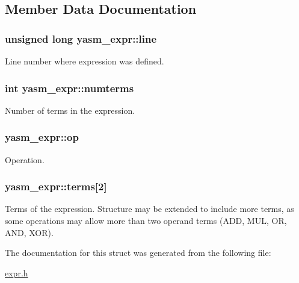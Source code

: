 \subsection{Member Data Documentation}
\hypertarget{structyasm__expr_a6eb7b868214984a4eb2c1fd4e86bf63b}{
\subsubsection[{line}]{\setlength{\rightskip}{0pt plus 5cm}unsigned long yasm\-\_\-expr\-::line}}\label{structyasm__expr_a6eb7b868214984a4eb2c1fd4e86bf63b}
Line number where expression was defined. \hypertarget{structyasm__expr_ac21ba309d6e842be19ce00c513645d93}{
\subsubsection[{numterms}]{\setlength{\rightskip}{0pt plus 5cm}int yasm\-\_\-expr\-::numterms}}\label{structyasm__expr_ac21ba309d6e842be19ce00c513645d93}
Number of terms in the expression. \hypertarget{structyasm__expr_a4a552c2cc6aedeab0811401e00de6536}{
\subsubsection[{op}]{ yasm\-\_\-expr\-::op}}\label{structyasm__expr_a4a552c2cc6aedeab0811401e00de6536}
Operation. \hypertarget{structyasm__expr_a7dcb23a5325b4fa2b66c9e52a07b0d33}{
\subsubsection[{terms}]{ yasm\-\_\-expr\-::terms\mbox{[}2\mbox{]}}}\label{structyasm__expr_a7dcb23a5325b4fa2b66c9e52a07b0d33}
Terms of the expression. Structure may be extended to include more terms, as some operations may allow more than two operand terms (A\-D\-D, M\-U\-L, O\-R, A\-N\-D, X\-O\-R). 

The documentation for this struct was generated from the following file\-:\begin{DoxyCompactItemize}
\item 
\hyperlink{expr_8h}{expr.\-h}\end{DoxyCompactItemize}
